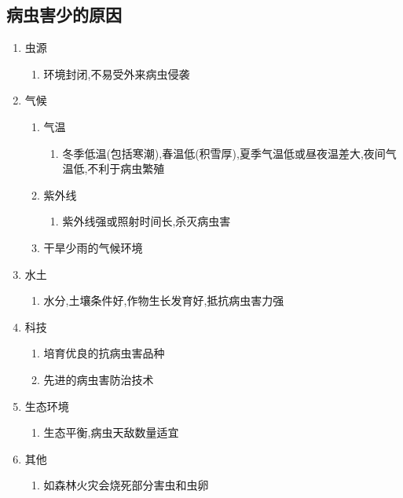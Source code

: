 \documentclass[a4paper]{article}
\begin{document}
    \subsection{病虫害少的原因}
    \begin{enumerate}
        \item 虫源
        \begin{enumerate}
            \item 环境封闭,不易受外来病虫侵袭
        \end{enumerate}
        \item 气候
        \begin{enumerate}
            \item 气温
            \begin{enumerate}
                \item 冬季低温(包括寒潮),春温低(积雪厚),夏季气温低或昼夜温差大,夜间气温低,不利于病虫繁殖
            \end{enumerate}
            \item 紫外线
            \begin{enumerate}
                \item 紫外线强或照射时间长,杀灭病虫害
            \end{enumerate}
            \item 干旱少雨的气候环境
        \end{enumerate}
        \item 水土
        \begin{enumerate}
            \item 水分,土壤条件好,作物生长发育好,抵抗病虫害力强
        \end{enumerate}
        \item 科技
        \begin{enumerate}
            \item 培育优良的抗病虫害品种
            \item 先进的病虫害防治技术 %
        \end{enumerate}
        \item 生态环境
        \begin{enumerate}
            \item 生态平衡,病虫天敌数量适宜
        \end{enumerate}
        \item 其他
        \begin{enumerate}
            \item 如森林火灾会烧死部分害虫和虫卵
        \end{enumerate}
    \end{enumerate}
\end{document}
